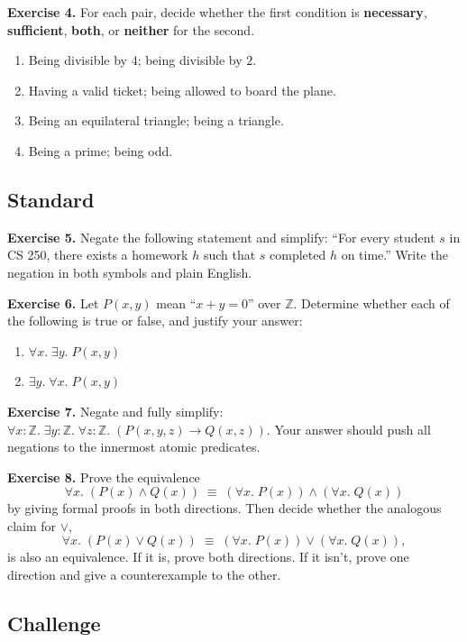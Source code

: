 \documentclass[11pt]{article}
\begin{document}
\bigskip
\textbf{Exercise 4.}\label{ex:m4:4} For each pair, decide whether the first condition is \textbf{necessary}, \textbf{sufficient}, \textbf{both}, or \textbf{neither} for the second.
\begin{enumerate}[label=(\alph*)]
  \item Being divisible by $4$; being divisible by $2$.
  \item Having a valid ticket; being allowed to board the plane.
  \item Being an equilateral triangle; being a triangle.
  \item Being a prime; being odd.
\end{enumerate}

\subsection*{Standard}

\textbf{Exercise 5.}\label{ex:m4:5} Negate the following statement and simplify: ``For every student $s$ in CS 250, there exists a homework $h$ such that $s$ completed $h$ on time.'' Write the negation in both symbols and plain English.

\bigskip
\textbf{Exercise 6.}\label{ex:m4:6} Let $P(x, y)$ mean ``$x + y = 0$'' over $\mathbb{Z}$. Determine whether each of the following is true or false, and justify your answer:
\begin{enumerate}[label=(\alph*)]
  \item $\forall x.\; \exists y.\; P(x, y)$
  \item $\exists y.\; \forall x.\; P(x, y)$
\end{enumerate}

\bigskip
\textbf{Exercise 7.}\label{ex:m4:7} Negate and fully simplify: $\forall x : \mathbb{Z}.\; \exists y : \mathbb{Z}.\; \forall z : \mathbb{Z}.\; (P(x, y, z) \to Q(x, z))$. Your answer should push all negations to the innermost atomic predicates.

\bigskip
\textbf{Exercise 8.}\label{ex:m4:8} Prove the equivalence
\[
  \forall x.\; (P(x) \wedge Q(x)) \;\equiv\; (\forall x.\; P(x)) \wedge (\forall x.\; Q(x))
\]
by giving formal proofs in both directions. Then decide whether the analogous claim for $\vee$,
\[
  \forall x.\; (P(x) \vee Q(x)) \;\equiv\; (\forall x.\; P(x)) \vee (\forall x.\; Q(x)),
\]
is also an equivalence. If it is, prove both directions. If it isn't, prove one direction and give a counterexample to the other.

\subsection*{Challenge}
\end{document}
